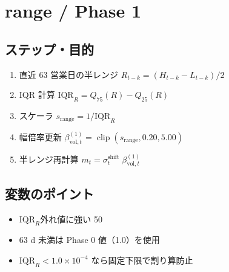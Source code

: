 
\section*{range / Phase 1}\nopagebreak[4]
\subsection*{ステップ・目的}
\begin{flushleft}
\begin{enumerate}
  \item 直近 63 営業日の半レンジ  
        \(R_{t-k}=(H_{t-k}-L_{t-k})/2\)
  \item IQR 計算  
        \(\mathrm{IQR}_R=Q_{75}(R)-Q_{25}(R)\)
  \item スケーラ  
        \(s_{\text{range}}=1/\mathrm{IQR}_R\)
  \item 幅倍率更新  
        \(\beta_{\text{vol},t}^{(1)}=\operatorname{clip}(s_{\text{range}},0.20,5.00)\)
  \item 半レンジ再計算  
        \(m_t=\sigma_t^{\text{shift}}\;\beta_{\text{vol},t}^{(1)}\)
\end{enumerate}
\end{flushleft}

\subsection*{変数のポイント}
\begin{flushleft}
\begin{itemize}
  \item \(\mathrm{IQR}_R\)\;外れ値に強い 50 %
  \item 63 d 未満は Phase 0 値（1.0）を使用  
  \item \(\mathrm{IQR}_R<1.0\times10^{-4}\) なら固定下限で割り算防止
\end{itemize}
\end{flushleft}

